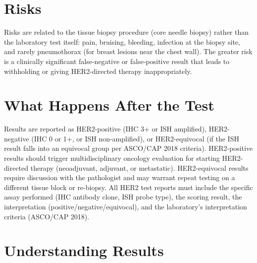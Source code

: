 \section*{Risks}
Risks are related to the tissue biopsy procedure (core needle biopsy) rather than the laboratory test itself: pain, bruising, bleeding, infection at the biopsy site, and rarely pneumothorax (for breast lesions near the chest wall). The greater risk is a clinically significant false-negative or false-positive result that leads to withholding or giving HER2-directed therapy inappropriately.

\section*{What Happens After the Test}
Results are reported as HER2-positive (IHC 3+ or ISH amplified), HER2-negative (IHC 0 or 1+, or ISH non-amplified), or HER2-equivocal (if the ISH result falls into an equivocal group per ASCO/CAP 2018 criteria). HER2-positive results should trigger multidisciplinary oncology evaluation for starting HER2-directed therapy (neoadjuvant, adjuvant, or metastatic). HER2-equivocal results require discussion with the pathologist and may warrant repeat testing on a different tissue block or re-biopsy. All HER2 test reports must include the specific assay performed (IHC antibody clone, ISH probe type), the scoring result, the interpretation (positive/negative/equivocal), and the laboratory's interpretation criteria (ASCO/CAP 2018).

\section*{Understanding Results}

